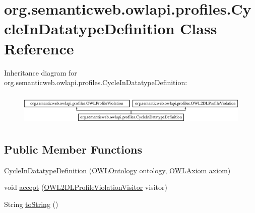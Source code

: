 \hypertarget{classorg_1_1semanticweb_1_1owlapi_1_1profiles_1_1_cycle_in_datatype_definition}{\section{org.\-semanticweb.\-owlapi.\-profiles.\-Cycle\-In\-Datatype\-Definition Class Reference}
\label{classorg_1_1semanticweb_1_1owlapi_1_1profiles_1_1_cycle_in_datatype_definition}
}
Inheritance diagram for org.\-semanticweb.\-owlapi.\-profiles.\-Cycle\-In\-Datatype\-Definition\-:\begin{figure}[H]
\begin{center}
\leavevmode
\includegraphics[height=1.595442cm]{classorg_1_1semanticweb_1_1owlapi_1_1profiles_1_1_cycle_in_datatype_definition}
\end{center}
\end{figure}
\subsection*{Public Member Functions}
\begin{DoxyCompactItemize}
\item 
\hyperlink{classorg_1_1semanticweb_1_1owlapi_1_1profiles_1_1_cycle_in_datatype_definition_ae338c3cd12853a3a5d11e0c624b98a7b}{Cycle\-In\-Datatype\-Definition} (\hyperlink{interfaceorg_1_1semanticweb_1_1owlapi_1_1model_1_1_o_w_l_ontology}{O\-W\-L\-Ontology} ontology, \hyperlink{interfaceorg_1_1semanticweb_1_1owlapi_1_1model_1_1_o_w_l_axiom}{O\-W\-L\-Axiom} \hyperlink{classorg_1_1semanticweb_1_1owlapi_1_1profiles_1_1_o_w_l_profile_violation_aa7c8e8910ed3966f64a2c003fb516214}{axiom})
\item 
void \hyperlink{classorg_1_1semanticweb_1_1owlapi_1_1profiles_1_1_cycle_in_datatype_definition_a43bdf676e9ba621f1a3711ee1b905f29}{accept} (\hyperlink{interfaceorg_1_1semanticweb_1_1owlapi_1_1profiles_1_1_o_w_l2_d_l_profile_violation_visitor}{O\-W\-L2\-D\-L\-Profile\-Violation\-Visitor} visitor)
\item 
String \hyperlink{classorg_1_1semanticweb_1_1owlapi_1_1profiles_1_1_cycle_in_datatype_definition_ac615a90a3f2ed0434bd392f540072d12}{to\-String} ()
\end{DoxyCompactItemize}


